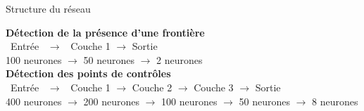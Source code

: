 \documentclass[ignorenonframetext,]{beamer}
\begin{document}
\begin{frame}{Structure du réseau}
	\noindent\begin{minipage}{0.82\textwidth}%
	\textbf{Détection de la présence d'une frontière}\\
	\ Entrée \ $\longrightarrow$ \ Couche 1 $\longrightarrow$ Sortie \\
	\scriptsize{100 neurones $\longrightarrow$ 50 neurones $\longrightarrow$ 2 neurones}\\
\newline
\normalsize{\textbf{Détection des points de contrôles}}\\
	\ Entrée \ $\longrightarrow$ \ Couche 1 $\longrightarrow$ Couche 2 $\longrightarrow$ Couche 3 $\longrightarrow$ Sortie \\
	\scriptsize{400 neurones $\longrightarrow$ 200 neurones $\longrightarrow$ 100 neurones $\longrightarrow$ 50 neurones $\longrightarrow$ 8 neurones}
	\end{minipage}%
	\hfill%
	\begin{minipage}{0.18\textwidth}\raggedleft

\end{minipage}
\end{frame}
\end{document}
